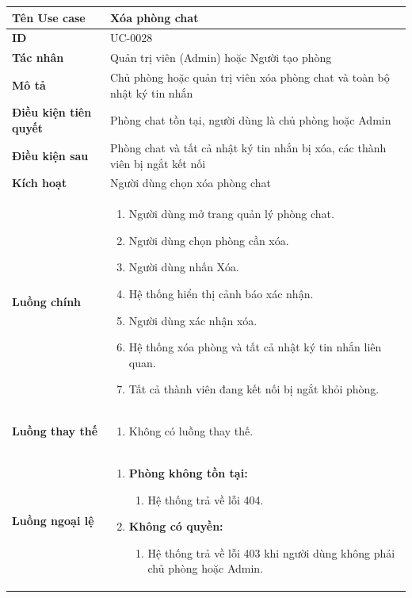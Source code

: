 {
\renewcommand{\arraystretch}{1.5}

\begin{tabularx}{\textwidth}{|>{\raggedright\arraybackslash}X|>{\raggedright\arraybackslash}X|}
\hline
\textbf{Tên Use case} & Xóa phòng chat \\
\hline
\textbf{ID} & UC-0028 \\
\hline
\textbf{Tác nhân} & Quản trị viên (Admin) hoặc Người tạo phòng \\
\hline
\textbf{Mô tả} & Chủ phòng hoặc quản trị viên xóa phòng chat và toàn bộ nhật ký tin nhắn \\
\hline
\textbf{Điều kiện tiên quyết} & Phòng chat tồn tại, người dùng là chủ phòng hoặc Admin \\
\hline
\textbf{Điều kiện sau} & Phòng chat và tất cả nhật ký tin nhắn bị xóa, các thành viên bị ngắt kết nối \\
\hline
\textbf{Kích hoạt} & Người dùng chọn xóa phòng chat \\
\hline
\textbf{Luồng chính} &
\begin{enumerate}
    \item Người dùng mở trang quản lý phòng chat.
    \item Người dùng chọn phòng cần xóa.
    \item Người dùng nhấn Xóa.
    \item Hệ thống hiển thị cảnh báo xác nhận.
    \item Người dùng xác nhận xóa.
    \item Hệ thống xóa phòng và tất cả nhật ký tin nhắn liên quan.
    \item Tất cả thành viên đang kết nối bị ngắt khỏi phòng.
\end{enumerate} \\
\hline
\textbf{Luồng thay thế} &
\begin{enumerate}
    \item Không có luồng thay thế.
\end{enumerate} \\
\hline
\textbf{Luồng ngoại lệ} &
\begin{enumerate}
    \item \textbf{Phòng không tồn tại:}
    \begin{enumerate}
        \item[2Err.] Hệ thống trả về lỗi 404.
    \end{enumerate}
    \item \textbf{Không có quyền:}
    \begin{enumerate}
        \item[2Err2.] Hệ thống trả về lỗi 403 khi người dùng không phải chủ phòng hoặc Admin.
    \end{enumerate}
\end{enumerate} \\
\hline
\end{tabularx}
}
